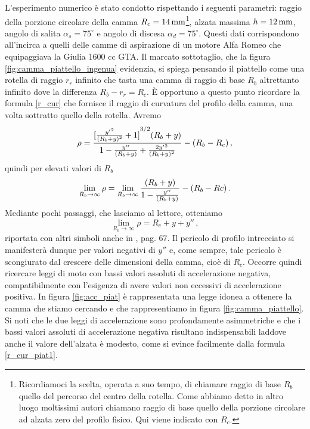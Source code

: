 \noindent L'esperimento numerico
\`e stato condotto rispettando i seguenti parametri: raggio della porzione circolare della camma
$R_c=14\,{\rm mm}$\footnote{Ricordiamoci la scelta, operata a suo tempo, di
chiamare raggio di base $R_b$ quello del percorso del centro della rotella. Come
abbiamo detto in altro luogo moltissimi autori chiamano raggio di base quello
della porzione circolare ad alzata zero del profilo fisico. Qui viene indicato
con $R_c$.}, alzata massima $h=12\, {\rm mm}$, angolo di salita
$\alpha_s=75^{\circ}$ e angolo di discesa $\alpha_d=75^{\circ}$.
Questi dati corrispondono all'incirca a quelli delle camme di aspirazione
di un motore Alfa Romeo che equipaggiava la Giulia 1600 cc GTA.
Il marcato sottotaglio, che la figura
\ref{fig:camma_piattello_ingenua} evidenzia,
si spiega pensando il piattello come una rotella di raggio $r_r$ infinito 
che tasta una camma di raggio di base $R_b$ altrettanto infinito dove la 
differenza $R_b - r_r = R_c$. 
\`E opportuno a questo punto ricordare la formula \ref{r_cur} che fornisce
il raggio di curvatura del profilo della camma, una volta sottratto quello
della rotella. Avremo
\begin{equation}
\rho ={{{{[{{y'}^2\over{(R_b + y)^2}}+1]}^{3/2}(R_b+y)}\over{{1-{y''\over{(R_b + y)}}} +{2{y'}^2\over{(R_b + y)^2}}}}}-(R_b-R_c)\,,
\label{r_cur_piat0}
\end{equation}
\noindent quindi per elevati valori di $R_b$
\begin{equation}
\lim_{R_b\to\infty}\rho =
\lim_{R_b\to\infty}{(R_b+y)\over{1 -{y''\over{(R_b + y)}}}} -(R_b-Rc)\,.
\label{r_cur_piat2}
\end{equation}
\noindent Mediante pochi passaggi, che lasciamo al lettore, otteniamo
\begin{equation}
\lim_{R_b\to\infty}\rho =
R_c + y + y''\,,
\label{r_cur_piat1}
\end{equation}
\noindent riportata con altri simboli anche in \cite{ruggieri}, pag. 67.
\noindent Il pericolo di profilo intrecciato si manifester\`a dunque
per valori negativi di $y''$ e, come sempre, tale pericolo
\`e scongiurato dal crescere delle dimensioni della camma, cio\`e di $R_c$.
Occorre quindi ricercare leggi di moto con  bassi valori assoluti di
accelerazione negativa, compatibilmente
con l'esigenza di avere valori non eccessivi di accelerazione positiva.
In figura \ref{fig:acc_piat} \`e rappresentata una legge idonea a ottenere
la camma che stiamo cercando e che rappresentiamo in figura
\ref{fig:camma_piattello}.
Si noti che le due leggi di accelerazione sono profondamente asimmetriche e che
i bassi valori assoluti di accelerazione negativa risultano indispensabili
laddove anche il valore dell'alzata \`e modesto, come si evince facilmente dalla
formula \ref{r_cur_piat1}.

